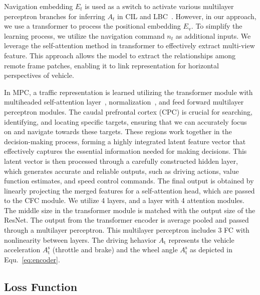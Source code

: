 Navigation embedding $E_{t}$ is used as a switch to activate various multilayer perceptron branches for inferring $A_{t}$ in CIL \cite{Codevilla:2018} and LBC~\cite{Codevilla:2019}. 
However, in our approach, we use a transformer to process the positional embedding $ E_\text{v} $.
To simplify the learning process, we utilize the navigation command $n_{t}$ as additional inputs.
%
We leverage the self-attention method in transformer to effectively extract multi-view feature\cite{Vaswani:2017}.
This approach allows the model to extract the relationships among remote frame patches, enabling it to link representation for horizontal perspectives of vehicle.


In MPC, a traffic representation is learned utilizing the transformer module with multiheaded self-attention layer~\cite{Vaswani:2017}, normalization~\cite{Ba:2016}, and feed forward multilayer perceptron modules. 
The caudal prefrontal cortex (CPC) is crucial for searching, identifying, and locating specific targets, ensuring that we can accurately focus on and navigate towards these targets. 
These regions work together in the decision-making process, forming a highly integrated latent feature vector that effectively captures the essential information needed for making decisions. 
This latent vector is then processed through a carefully constructed hidden layer, which generates accurate and reliable outputs, such as driving actions, value function estimates, and speed control commands.
The final output is obtained by linearly projecting the merged features for a self-attention head, which are passed to the CFC module.
We utilize 4 layers, and a layer with 4 attention modules. 
The middle size in the transformer module is matched with the output size of the ResNet.
%
The output from the transformer encoder is average pooled and passed through a multilayer perceptron.
This multilayer perceptron includes 3 FC with nonlinearity between layers.
The driving hehavior $A_\text{t}$ represents the vehicle acceleration $A_\text{t}^\text{s}$ (throttle and brake) and the wheel angle $A_\text{t}^\text{s}$ as depicted in Equ.~\ref{eq:encoder}. 





\subsection{Loss Function}

